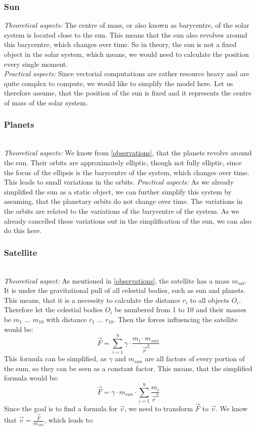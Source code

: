 \documentclass[conference,compsoc]{IEEEtran}
\begin{document}
\subsubsection{Sun}
\hfill\newline
\emph{Theoretical aspects: }The centre of mass, or also known as barycentre, of the solar system is located close to the sun. This means that the sun also revolves around this barycentre, which changes over time. So in theory, the sun is not a fixed object in the solar system, which means, we would need to calculate the position every single moment.\\
\emph{Practical aspects: } Since vectorial computations are rather resource heavy and are quite complex to compute, we would like to simplify the model here. Let us therefore assume, that the position of the sun is fixed and it represents the centre of mass of the solar system. 
\subsubsection{Planets}\hfill\\
\emph{Theoretical aspects: } We know from \ref{observations}, that the planets revolve around the sun. Their orbits are approximately elliptic, though not fully elliptic, since the focus of the ellipsis is the barycentre of the system, which changes over time. This leads to small variations in the orbits. 
\emph{Practical aspects: } As we already simplified the sun as a static object, we can further simplify this system by assuming, that the planetary orbits do not change over time. The variations in the orbits are related to the variations of the barycentre of the system. As we already cancelled these variations out in the simplification of the sun, we can also do this here.
\subsubsection{Satellite}\hfill\\
\emph{Theoretical aspect: } As mentioned in \ref{observations}, the satellite has a mass $m_{sat}$. It is under the gravitational pull of all celestial bodies, such as sun and planets. This means, that it is a necessity to calculate the distance $r_{i}$ to all objects $O_{i}$.
Therefore let the celestial bodies $O_{i}$ be numbered from 1 to 10 and their masses be $m_{1}$ ... $m_{10}$ with distance $r_{1}$ ... $r_{10}$. Then the forces influencing the satellite would be:
$$ \vec{F} = \sum_{i=1}^{9}{\gamma \cdot \frac{m_{i} \cdot m_{sun}}{\vec{r}^{2}}} $$
This formula can be simplified, as $\gamma$ and $m_{sun}$ are all factors of every portion of the sum, so they can be seen as a constant factor. This means, that the simplified formula would be:
$$ \vec{F} = \gamma \cdot m_{sun} \cdot \sum_{i=1}^{9}{\frac{m_{i}}{\vec{r}^{2}}} $$
Since the goal is to find a formula for $\vec{v}$, we need to transform $\vec{F}$ to $\vec{v}$. We know that $\vec{v} = \frac{\vec{F}}{m_{sun}}$, which leads to:
 
\end{document}
